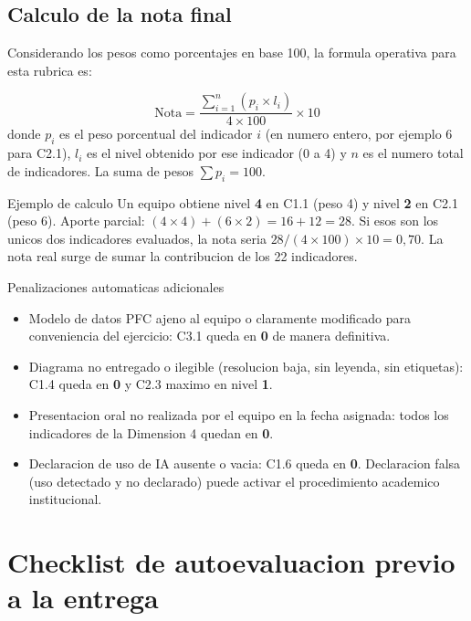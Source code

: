 \documentclass[11pt,a4paper]{article}
\begin{document}
\subsection{Calculo de la nota final}

Considerando los pesos como porcentajes en base 100, la formula operativa para esta rubrica es:

\[
\text{Nota} = \frac{\sum_{i=1}^{n} \left( p_i \times l_i \right)}{4 \times 100} \times 10
\]
donde $p_i$ es el peso porcentual del indicador $i$ (en numero entero, por ejemplo 6 para C2.1), $l_i$ es el nivel obtenido por ese indicador (0 a 4) y $n$ es el numero total de indicadores. La suma de pesos $\sum p_i = 100$.

\begin{cajaejemplo}{Ejemplo de calculo}
Un equipo obtiene nivel \textbf{4} en C1.1 (peso 4) y nivel \textbf{2} en C2.1 (peso 6). Aporte parcial: $(4 \times 4) + (6 \times 2) = 16 + 12 = 28$. Si esos son los unicos dos indicadores evaluados, la nota seria $28 / (4 \times 100) \times 10 = 0{,}70$. La nota real surge de sumar la contribucion de los 22 indicadores.
\end{cajaejemplo}

\begin{cajacritica}{Penalizaciones automaticas adicionales}
\begin{itemize}
\item Modelo de datos PFC ajeno al equipo o claramente modificado para conveniencia del ejercicio: C3.1 queda en \textbf{0} de manera definitiva.
\item Diagrama no entregado o ilegible (resolucion baja, sin leyenda, sin etiquetas): C1.4 queda en \textbf{0} y C2.3 maximo en nivel \textbf{1}.
\item Presentacion oral no realizada por el equipo en la fecha asignada: todos los indicadores de la Dimension 4 quedan en \textbf{0}.
\item Declaracion de uso de IA ausente o vacia: C1.6 queda en \textbf{0}. Declaracion falsa (uso detectado y no declarado) puede activar el procedimiento academico institucional.
\end{itemize}
\end{cajacritica}

\newpage
\section{Checklist de autoevaluacion previo a la entrega}
\end{document}
